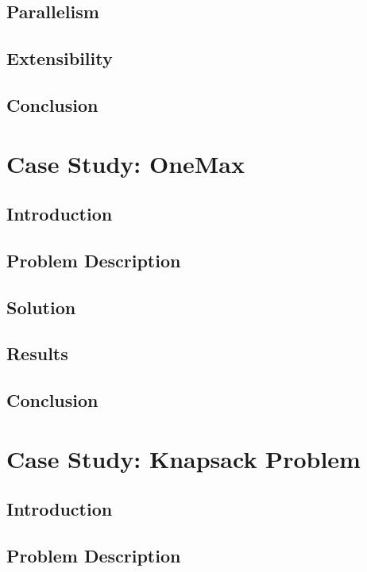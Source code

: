   \section{Parallelism}
  \label{sec:parallelism}
    \Blindtext
  \section{Extensibility}
  \label{sec:extensibility}
    \Blindtext
  \section{Conclusion}
  \label{sec:conclusion}
    \Blindtext

\chapter{Case Study: OneMax}
\label{chap:case_study_onemax}
  \section{Introduction}
  \label{sec:introduction}
    \Blindtext
  \section{Problem Description}
  \label{sec:problem_description}
    \Blindtext
  \section{Solution}
  \label{sec:solution}
    \Blindtext
  \section{Results}
  \label{sec:results}
    \Blindtext
  \section{Conclusion}
  \label{sec:conclusion}
    \Blindtext

\chapter{Case Study: Knapsack Problem}
\label{chap:case_study_knapsack}
  \section{Introduction}
  \label{sec:introduction}
    \Blindtext
  \section{Problem Description}
  \label{sec:problem_description}
    \Blindtext
